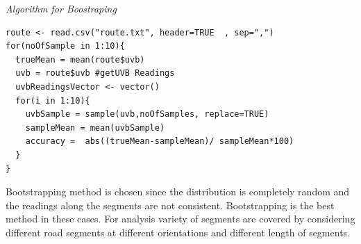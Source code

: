 \documentclass[10pt]{sigplan-proc-varsize}
\begin{document}
\begin{center}
{ 	

\begin{center} 
{\small \sl Algorithm for Boostraping \\}
\end{center} }
\end{center}

\lstset{caption=R Code for Bootstraping,breaklines=true, tabsize=4,    
        frame=single}
\begin{lstlisting}
route <- read.csv("route.txt", header=TRUE  , sep=",")
for(noOfSample in 1:10){  
  trueMean = mean(route$uvb)
  uvb = route$uvb #getUVB Readings
  uvbReadingsVector <- vector()
  for(i in 1:10){
    uvbSample = sample(uvb,noOfSamples, replace=TRUE)
    sampleMean = mean(uvbSample)
    accuracy =  abs((trueMean-sampleMean)/ sampleMean*100)
  }
}\end{lstlisting}

Bootstrapping method is chosen since the distribution is completely random and the readings along the segments are not consistent. Bootstrapping is the best method in these cases. For analysis variety of segments are covered by considering different road segments at different orientations and different length of segments. 
\end{document}
